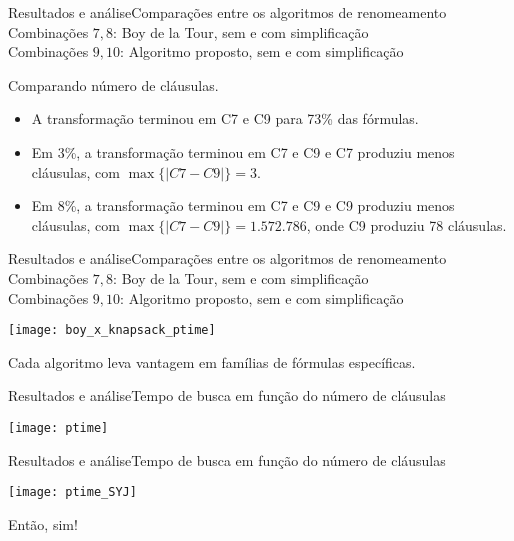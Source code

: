 \begin{frame}{Resultados e análise}{Comparações entre os algoritmos de renomeamento}
	Combinações $7,8$: Boy de la Tour, sem e com simplificação\\
	Combinações $9,10$: Algoritmo proposto, sem e com simplificação
	
	\pause \begin{center}Comparando número de cláusulas.\end{center}
	\begin{itemize}
		\pause\item A transformação terminou em C7 e C9 para 73\% das fórmulas.
		\pause\item Em 3\%, a transformação terminou em C7 e C9 e C7 produziu menos cláusulas, com $\max \{|C7-C9| \} = 3$.
		\pause\item Em 8\%, a transformação terminou em C7 e C9 e C9 produziu menos cláusulas, com $\max \{|C7-C9| \} = 1.572.786$, onde C9 produziu 78 cláusulas.
	\end{itemize}
\end{frame}

\begin{frame}{Resultados e análise}{Comparações entre os algoritmos de renomeamento}
	Combinações $7,8$: Boy de la Tour, sem e com simplificação\\
	Combinações $9,10$: Algoritmo proposto, sem e com simplificação
	
	\vspace{-.4cm}
	\pause
	\begin{center}
		\texttt{[image: boy\_x\_knapsack\_ptime]}
	\end{center}
	
	\vspace{-.6cm}
	\pause Cada algoritmo leva vantagem em famílias de fórmulas específicas.
\end{frame}

\begin{frame}{Resultados e análise}{Tempo de busca em função do número de cláusulas}
	\begin{center}
		\texttt{[image: ptime]}
	\end{center}
\end{frame}

\begin{frame}{Resultados e análise}{Tempo de busca em função do número de cláusulas}
	\begin{center}
		\texttt{[image: ptime\_SYJ]}
	\end{center}
	
	\pause Então, sim!
\end{frame}
